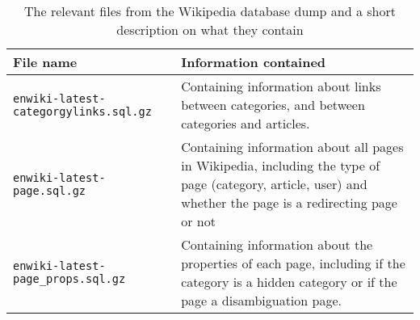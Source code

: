 





\begin{table}[ht]
\renewcommand{\arraystretch}{1.25}
\begin{tabularx}{\textwidth}{l|X}
\textbf{File name} & \textbf{Information contained}\\ \hline
\texttt{enwiki-latest-categorgylinks.sql.gz} &  Containing information about links between categories, and between categories and articles. \\ \hline
\texttt{enwiki-latest-page.sql.gz} & Containing information about all pages in Wikipedia, including the type of page (category, article, user) and whether the page is a redirecting page or not\\ \hline
\texttt{enwiki-latest-page\_props.sql.gz} & Containing information about the properties of each page, including if the category is a hidden category or if the page a disambiguation page.
\end{tabularx}
\\[10pt]
\caption[Relevant files from Wikipedia database dump]{The relevant files from the Wikipedia database dump and a short description on what they contain}
\label{tab:databasedumpfiles}
\end{table}



